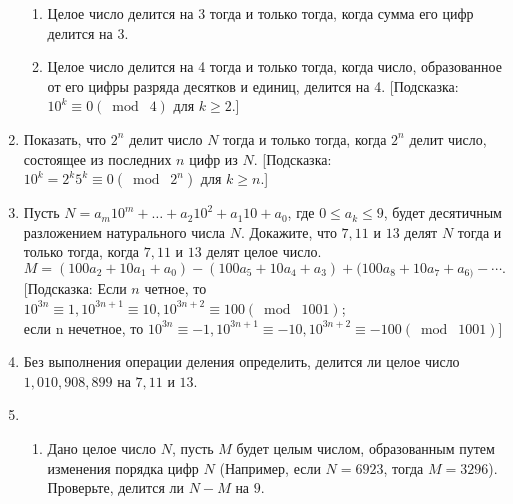 \documentclass[11pt]{article}
\begin{document}
\begin{enumerate}
\begin{enumerate}
\item Целое число делится на 3 тогда и только тогда, когда сумма его цифр делится на 3.
\item Целое число делится на 4 тогда и только тогда, когда число, образованное от его цифры разряда десятков и единиц, делится на 4. [Подсказка: $10^{k}\equiv0(\bmod\; 4)$ для $ k\geq2 $.]
\end{enumerate}
\item Показать, что $ 2^{n} $ делит число $N$ тогда и только тогда, когда  $ 2^{n} $ делит число, состоящее из последних $n$ цифр из $N$. [Подсказка: $10^{k}=2^{k}5^{k}\equiv0(\bmod\; 2^{n}) $ для $ k\geq n $.]
\item Пусть $ N=a_{m}10^{m}+\ldots+a_{2}10^{2}+a_{1}10+a_{0} $, где $ 0\leq a_{k}\leq9 $, будет десятичным разложением натурального числа $N$. Докажите, что $7,11$ и $13$ делят $N$ тогда и только тогда, когда $7,11$ и $13$ делят целое число.  \[M=(100a_{2}+10a_{1}+a_{0})-(100a_{5}+10a_{4}+a_{3})+(100a_{8}+10a_{7}+a_{6)}-\cdots. \] [Подсказка: Если $n$ четное, то $ 10^{3n}\equiv1, 10^{3n+1}\equiv10,10^{3n+2}\equiv100(\bmod\; 1001) $;\\ если n нечетное, то $ 10^{3n}\equiv-1, 10^{3n+1}\equiv-10,10^{3n+2}\equiv-100(\bmod\; 1001)  $]
\item Без выполнения операции деления определить, делится ли целое число $1,010,908,899 $ на $ 7,11 $ и $13$.
\item 
\begin{enumerate}
\item Дано целое число $N$, пусть $M$ будет целым числом, образованным путем изменения порядка цифр $N$ (Например, если $N=6923$, тогда $M=3296$).\\ Проверьте, делится ли $N-M$ на $9$.
\end{enumerate}
\end{enumerate}
\end{document}
